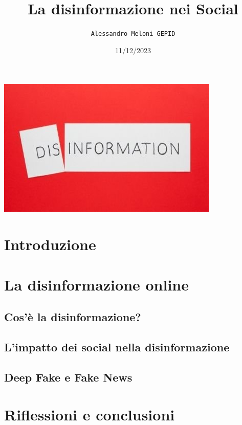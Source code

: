 \documentclass{article}
\title{\textbf{La disinformazione nei Social}}
\author{\texttt{Alessandro Meloni GEPID}}
\date{11/12/2023}
\begin{document}
\maketitle
    \includegraphics[width = 0.6\linewidth]{Immagini/disinformation.jpeg}
\centering \tableofcontents
\newpage \section{Introduzione}
\flushleft 
\newpage \section{La disinformazione online}

\flushleft \subsection{Cos'è la disinformazione?}

\flushleft \subsection{L'impatto dei social nella disinformazione}

\flushleft \subsection{Deep Fake e Fake News}

\centering
\newpage \section{Riflessioni e conclusioni}
\end{document}
